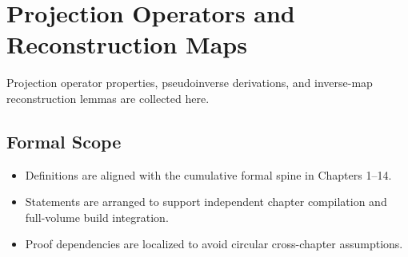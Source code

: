 \documentclass[../../clio.tex]{subfiles}
\begin{document}
\chapter{Projection Operators and Reconstruction Maps}
\label{apx:b-projections}

Projection operator properties, pseudoinverse derivations, and inverse-map reconstruction lemmas are collected here.

\section{Formal Scope}
\begin{itemize}
  \item Definitions are aligned with the cumulative formal spine in Chapters 1--14.
  \item Statements are arranged to support independent chapter compilation and full-volume build integration.
  \item Proof dependencies are localized to avoid circular cross-chapter assumptions.
\end{itemize}
\end{document}
